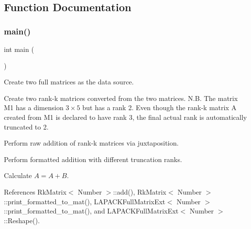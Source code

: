 \subsection{Function Documentation}
\mbox{\label{rkmatrix-add-formatted_8cc_ae66f6b31b5ad750f1fe042a706a4e3d4}} 
\subsubsection{\texorpdfstring{main()}{main()}}
{\footnotesize\ttfamily int main (\begin{DoxyParamCaption}{ }\end{DoxyParamCaption})}

Create two full matrices as the data source.

Create two rank-\/k matrices converted from the two matrices. N.\+B. The matrix {\ttfamily M1} has a dimension $3 \times 5$ but has a rank 2. Even though the rank-\/k matrix {\ttfamily A} created from {\ttfamily M1} is declared to have rank 3, the final actual rank is automatically truncated to 2.

Perform raw addition of rank-\/k matrices via juxtaposition.

Perform formatted addition with different truncation ranks.

Calculate $A = A + B$.

References Rk\+Matrix$<$ Number $>$\+::add(), Rk\+Matrix$<$ Number $>$\+::print\+\_\+formatted\+\_\+to\+\_\+mat(), L\+A\+P\+A\+C\+K\+Full\+Matrix\+Ext$<$ Number $>$\+::print\+\_\+formatted\+\_\+to\+\_\+mat(), and L\+A\+P\+A\+C\+K\+Full\+Matrix\+Ext$<$ Number $>$\+::\+Reshape().

